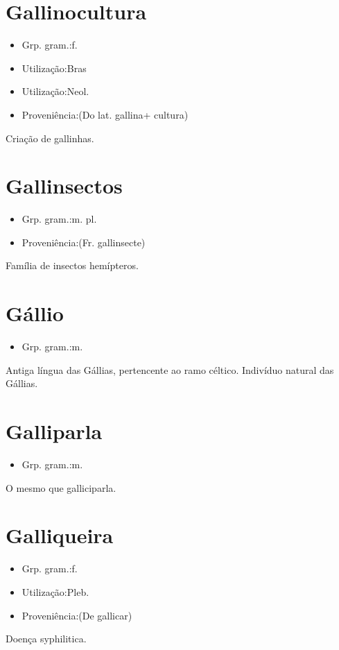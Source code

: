 \section{Gallinocultura}
\begin{itemize}
\item {Grp. gram.:f.}
\end{itemize}
\begin{itemize}
\item {Utilização:Bras}
\end{itemize}
\begin{itemize}
\item {Utilização:Neol.}
\end{itemize}
\begin{itemize}
\item {Proveniência:(Do lat. \textunderscore gallina\textunderscore  + \textunderscore cultura\textunderscore )}
\end{itemize}
Criação de gallinhas.
\section{Gallinsectos}
\begin{itemize}
\item {Grp. gram.:m. pl.}
\end{itemize}
\begin{itemize}
\item {Proveniência:(Fr. \textunderscore gallinsecte\textunderscore )}
\end{itemize}
Família de insectos hemípteros.
\section{Gállio}
\begin{itemize}
\item {Grp. gram.:m.}
\end{itemize}
Antiga língua das Gállias, pertencente ao ramo céltico.
Indivíduo natural das Gállias.
\section{Galliparla}
\begin{itemize}
\item {Grp. gram.:m.}
\end{itemize}
O mesmo que \textunderscore galliciparla\textunderscore .
\section{Galliqueira}
\begin{itemize}
\item {Grp. gram.:f.}
\end{itemize}
\begin{itemize}
\item {Utilização:Pleb.}
\end{itemize}
\begin{itemize}
\item {Proveniência:(De \textunderscore gallicar\textunderscore )}
\end{itemize}
Doença syphilitica.
